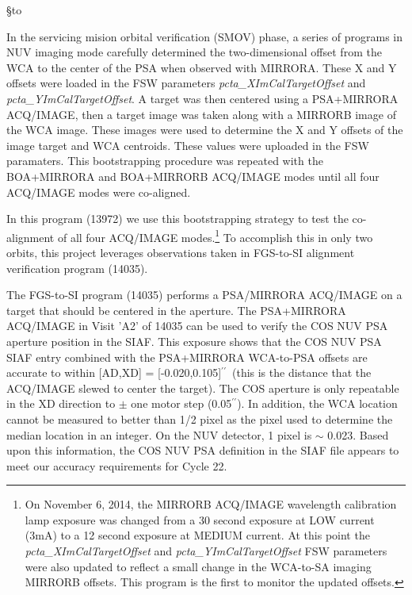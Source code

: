 \documentclass[12pt]{reportj}
\def\arcsec{\hbox{$^{\prime\prime}$}}
\def\ssection#1{\addtocounter{section}{1} \setcounter{subsection}{0} \S*{\hbox to \hsize{\large\bf \arabic{section}. #1\hfill }}}
\begin{document}
\lhead{}
\rhead{}
\vspace{-0.3cm}
\ssection{Verifying the ACQ/IMAGE WCA-to-SA Offsets.\label{sec:acqimage} }
\vspace{-0.3cm}

In the servicing mision orbital verification (SMOV) phase, a series of programs in NUV imaging mode
carefully determined the two-dimensional offset from the WCA to the center of the PSA when observed with MIRRORA.
These X and Y offsets were loaded in the FSW parameters {\it pcta\_XImCalTargetOffset} and {\it pcta\_YImCalTargetOffset}.
A target was then centered using a PSA+MIRRORA ACQ/IMAGE, then a target image was taken along with a MIRRORB image
of the WCA image. These images were used to determine the X and Y offsets of the image target and WCA centroids.
These values were uploaded in the FSW paramaters. This bootstrapping procedure was repeated with the BOA+MIRRORA
and BOA+MIRRORB ACQ/IMAGE modes until all four ACQ/IMAGE modes were co-aligned.

In this program (13972) we use this bootstrapping strategy to test the co-alignment of all four ACQ/IMAGE modes.\footnote{On November 6, 2014,
the MIRRORB ACQ/IMAGE wavelength calibration lamp exposure was changed from a 30 second exposure
at LOW current (3mA) to a 12 second exposure at MEDIUM current. At this point the {\it pcta\_XImCalTargetOffset} and {\it pcta\_YImCalTargetOffset}
FSW parameters were also updated to reflect a small change in the WCA-to-SA imaging MIRRORB offsets. This program is the first
to monitor the updated offsets.}
To accomplish this in only two orbits, this project leverages observations taken in FGS-to-SI alignment verification
program (14035).

The FGS-to-SI program (14035) performs a PSA/MIRRORA ACQ/IMAGE on a target that should be centered in the aperture.
The PSA+MIRRORA ACQ/IMAGE in Visit 'A2' of 14035 can be used to verify the COS NUV PSA aperture position in the SIAF.
This exposure shows that the COS NUV PSA SIAF entry combined with the PSA+MIRRORA WCA-to-PSA offsets are
accurate to within [AD,XD] = [-0.020,0.105]\arcsec\ (this is the distance that the ACQ/IMAGE slewed to center the target).
The COS aperture is only repeatable in the XD direction to $\pm$ one motor step (0.05\arcsec). In addition, the WCA location
cannot be measured to better than 1/2 pixel as the pixel used to determine the median location in an integer.
On the NUV detector, 1 pixel is $\sim$ 0.023\arsec. Based upon this information, the COS NUV PSA definition
in the SIAF file appears to meet our accuracy requirements for Cycle 22.
\end{document}

